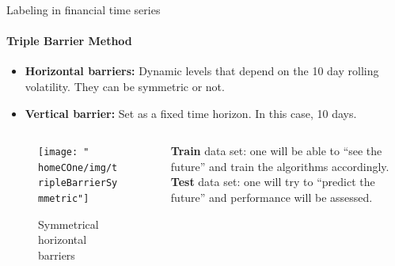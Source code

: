 \documentclass[usenames,dvipsnames]{beamer} %
\newcommand{\homeCOne}{../../Chapter 1 - Metalabeling/Draft}
\begin{document}
\begin{frame}{Labeling in financial time series}
\framesubtitle{Triple Barrier Method}

\begin{itemize}
	\item \textbf{Horizontal barriers:} Dynamic levels that depend 
	on the 10 day rolling volatility. They can be symmetric or not.
	
	\item \textbf{Vertical barrier:} Set as a fixed time horizon. 
	In this case, 10 days.
\end{itemize}

\begin{columns}
\begin{column}{.7\textwidth}
\begin{figure}[htbp]
	\centering
	\texttt{[image: "\\homeCOne/img/tripleBarrierSymmetric"]}
	\caption{Symmetrical horizontal barriers}
\end{figure}
\end{column}
\begin{column}{.35\textwidth}
	\textbf{Train} data set: one will be able to ``see the future'' and train 
	the algorithms accordingly.\\
	
	\vspace{.6cm}
	\textbf{Test} data set: one will try to ``predict the future'' and 
	performance will be assessed.
\end{column}
\end{columns}

\end{frame}	
%
%	
%		
%	
%	
%	
\end{document}
